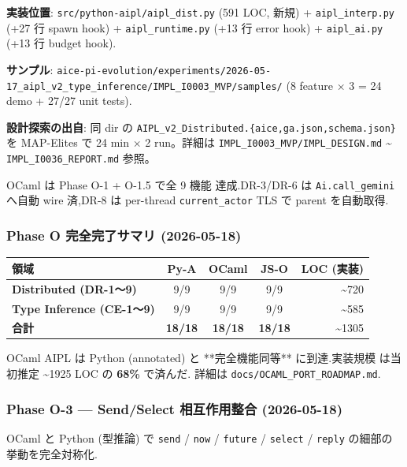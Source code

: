 \documentclass[10pt,a4paper,landscape]{article}
\newcommand{\Yes}{\textcolor{green!50!black}{\textbf{\checkmark}}}
\begin{document}
\textbf{実装位置}: \texttt{src/python-aipl/aipl\_dist.py} (591 LOC, 新規) +
\texttt{aipl\_interp.py} (+27 行 spawn hook) +
\texttt{aipl\_runtime.py} (+13 行 error hook) +
\texttt{aipl\_ai.py} (+13 行 budget hook).

\textbf{サンプル}: \texttt{aice-pi-evolution/experiments/2026-05-17\_aipl\_v2\_type\_inference/IMPL\_I0003\_MVP/samples/}
(8 feature $\times$ 3 = 24 demo + 27/27 unit tests).

\textbf{設計探索の出自}: 同 dir の \texttt{AIPL\_v2\_Distributed.\{aice,ga.json,schema.json\}}
を MAP-Elites で 24 min $\times$ 2 run。詳細は \texttt{IMPL\_I0003\_MVP/IMPL\_DESIGN.md}
\textasciitilde{} \texttt{IMPL\_I0036\_REPORT.md} 参照。

\smallskip
\noindent OCaml は Phase O-1 + O-1.5 で全 9 機能 \Yes 達成.DR-3/DR-6 は
\texttt{Ai.call\_gemini} へ自動 wire 済,DR-8 は per-thread
\texttt{current\_actor} TLS で parent を自動取得.

\subsubsection*{Phase O 完全完了サマリ (2026-05-18)}

\begin{center}
\begin{tabular}{lcccr}
\toprule
領域 & Py-A & OCaml & JS-O & LOC (実装) \\
\midrule
\textbf{Distributed (DR-1〜9)} & \Yes 9/9 & \Yes 9/9 & \Yes 9/9 & \textasciitilde 720 \\
\textbf{Type Inference (CE-1〜9)} & \Yes 9/9 & \Yes 9/9 & \Yes 9/9 & \textasciitilde 585 \\
\midrule
\textbf{合計} & \textbf{18/18} & \textbf{18/18} & \textbf{18/18} & \textasciitilde 1305 \\
\bottomrule
\end{tabular}
\end{center}

OCaml AIPL は Python (annotated) と **完全機能同等** に到達.実装規模
は当初推定 \textasciitilde 1925 LOC の \textbf{68\%} で済んだ.
詳細は \texttt{docs/OCAML\_PORT\_ROADMAP.md}.

\subsubsection*{Phase O-3 — Send/Select 相互作用整合 (2026-05-18)}

OCaml と Python (型推論) で \texttt{send} / \texttt{now} / \texttt{future} /
\texttt{select} / \texttt{reply} の細部の挙動を完全対称化.
\end{document}
